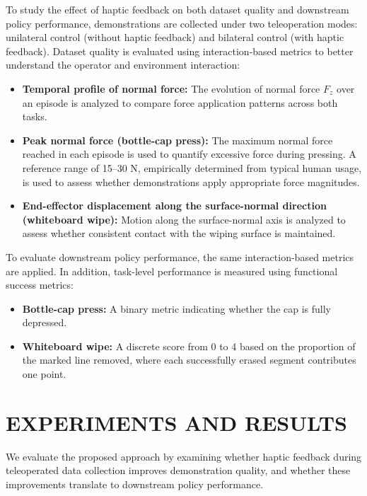 \documentclass[letterpaper, 10 pt, conference]{ieeeconf}  %
\begin{document}
To study the effect of haptic feedback on both dataset quality and downstream policy performance, demonstrations are collected under two teleoperation modes: unilateral control (without haptic feedback) and bilateral control (with haptic feedback). Dataset quality is evaluated using interaction-based metrics to better understand the operator and environment interaction:

\begin{itemize}
    \item \textbf{Temporal profile of normal force:} The evolution of normal force $F_z$ over an episode is analyzed to compare force application patterns across both tasks.
    \item \textbf{Peak normal force (bottle-cap press):} The maximum normal force reached in each episode is used to quantify excessive force during pressing. A reference range of 15--30 N, empirically determined from typical human usage, is used to assess whether demonstrations apply appropriate force magnitudes.
    \item \textbf{End-effector displacement along the surface-normal direction (whiteboard wipe):} Motion along the surface-normal axis is analyzed to assess whether consistent contact with the wiping surface is maintained.
\end{itemize}


To evaluate downstream policy performance, the same interaction-based metrics are applied. In addition, task-level performance is measured using functional success metrics:
\begin{itemize}
    \item \textbf{Bottle-cap press:} A binary metric indicating whether the cap is fully depressed.
    \item \textbf{Whiteboard wipe:} A discrete score from 0 to 4 based on the proportion of the marked line removed, where each successfully erased segment contributes one point.
\end{itemize}
 


\section{EXPERIMENTS AND RESULTS}
We evaluate the proposed approach by examining whether haptic feedback during teleoperated data collection improves demonstration quality, and whether these improvements translate to downstream policy performance.
\end{document}
